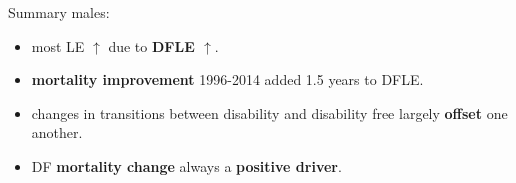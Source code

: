 \documentclass[20pt,usenames,dvipsnames]{beamer}
\begin{document}


\begin{frame}[plain]
\Large
\begin{center}
Summary males:
\begin{itemize}[<+->]
\item most LE $\uparrow$ due to \textbf{DFLE $\uparrow$}.
\item \textbf{mortality improvement} 1996-2014 added 1.5 years to DFLE.
\item changes in transitions between disability and disability free largely \textbf{offset} one another.
\item DF \textbf{mortality change} always a \textbf{positive driver}.
\end{itemize}
\end{center}
\end{frame}
\end{document}
